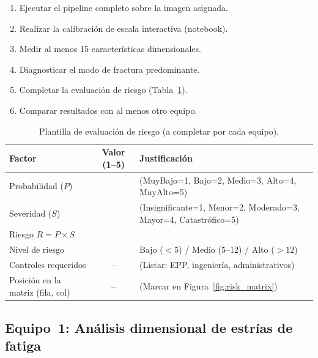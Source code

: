 \documentclass[12pt,a4paper]{article}
\begin{document}
\begin{enumerate}
	\item Ejecutar el pipeline completo sobre la imagen asignada.
	\item Realizar la calibración de escala interactiva (notebook).
	\item Medir al menos 15 características dimensionales.
	\item Diagnosticar el modo de fractura predominante.
	\item Completar la evaluación de riesgo
	      (Tabla~\ref{tab:risk_template}).
	\item Comparar resultados con al menos otro equipo.
\end{enumerate}

\begin{table}[H]
	\centering
	\caption{Plantilla de evaluación de riesgo (a completar por cada equipo).}
	\label{tab:risk_template}
	\small
	\begin{tabularx}{\textwidth}{l c X}
		\toprule
		\textbf{Factor}                   & \textbf{Valor (1--5)} & \textbf{Justificación}                                           \\
		\midrule
		Probabilidad ($P$)                &                       & (MuyBajo=1, Bajo=2, Medio=3, Alto=4, MuyAlto=5)                  \\
		Severidad ($S$)                   &                       & (Insignificante=1, Menor=2, Moderado=3, Mayor=4, Catastrófico=5) \\
		\midrule
		Riesgo $R = P \times S$           &                       &                                                                  \\
		Nivel de riesgo                   &                       & Bajo ($<5$) / Medio (5--12) / Alto ($>12$)                       \\
		\midrule
		Controles requeridos              & {--}                  & (Listar: EPP, ingeniería, administrativos)                       \\
		Posición en la matriz (fila, col) & {--}                  & (Marcar en Figura~\ref{fig:risk_matrix})                         \\
		\bottomrule
	\end{tabularx}
\end{table}

\subsection{Equipo~1: Análisis dimensional de estrías de fatiga}
\label{sec:eq1}
\end{document}

